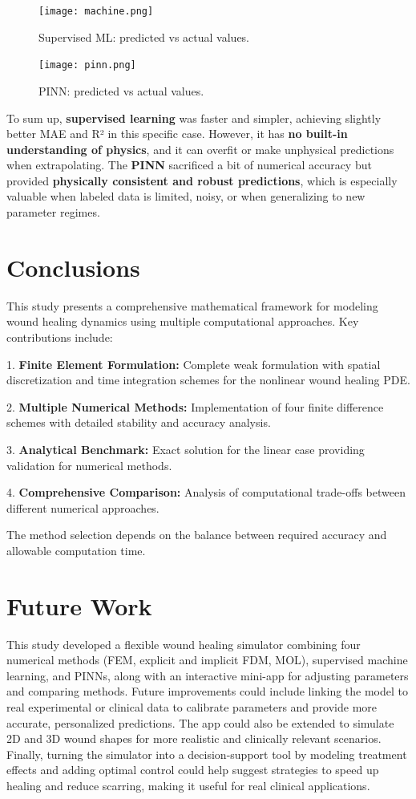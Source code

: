 \documentclass[conference]{IEEEtran}
\begin{document}
\begin{figure}[h!]
\centering
\texttt{[image: machine.png]} %
\caption{Supervised ML: predicted vs actual values.}
\label{fig:ml_results}
\end{figure}

\begin{figure}[h!]
\centering
\texttt{[image: pinn.png]} %
\caption{PINN: predicted vs actual values.}
\label{fig:pinn_results}
\end{figure}

To sum up, \textbf{supervised learning} was faster and simpler, achieving slightly better MAE and R² in this specific case. However, it has \textbf{no built-in understanding of physics}, and it can overfit or make unphysical predictions when extrapolating. The \textbf{PINN} sacrificed a bit of numerical accuracy but provided \textbf{physically consistent and robust predictions}, which is especially valuable when labeled data is limited, noisy, or when generalizing to new parameter regimes.


\section{Conclusions}

This study presents a comprehensive mathematical framework for modeling wound healing dynamics using multiple computational approaches. Key contributions include:

1. \textbf{Finite Element Formulation:} Complete weak formulation with spatial discretization and time integration schemes for the nonlinear wound healing PDE.

2. \textbf{Multiple Numerical Methods:} Implementation of four finite difference schemes with detailed stability and accuracy analysis.

3. \textbf{Analytical Benchmark:} Exact solution for the linear case providing validation for numerical methods.

4. \textbf{Comprehensive Comparison:} Analysis of computational trade-offs between different numerical approaches.

The method selection depends on the balance between required accuracy and allowable computation time.


\section{Future Work}
This study developed a flexible wound healing simulator combining four numerical methods (FEM, explicit and implicit FDM, MOL), supervised machine learning, and PINNs, along with an interactive mini-app for adjusting parameters and comparing methods. Future improvements could include linking the model to real experimental or clinical data to calibrate parameters and provide more accurate, personalized predictions. The app could also be extended to simulate 2D and 3D wound shapes for more realistic and clinically relevant scenarios. Finally, turning the simulator into a decision-support tool by modeling treatment effects and adding optimal control could help suggest strategies to speed up healing and reduce scarring, making it useful for real clinical applications.
 
\end{document}
